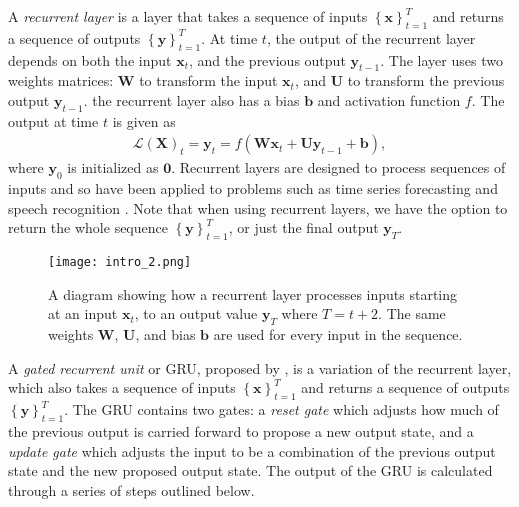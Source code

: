 \documentclass{somasmsc}
\begin{document}
A \textit{recurrent layer} is a layer that takes a sequence of inputs $\left\{\pmb{x}\right\}_{t=1}^T$ and returns a sequence of outputs $\left\{\pmb{y}\right\}_{t=1}^T$. At time $t$, the output of the recurrent layer depends on both the input $\pmb{x}_t$, and the previous output $\pmb{y}_{t-1}$. The layer uses two weights matrices: $\mathbf{W}$ to transform the input $\pmb{x}_t$, and $\mathbf{U}$ to transform the previous output $\pmb{y}_{t-1}$. the recurrent layer also has a bias $\pmb{b}$ and activation function $f$. The output at time $t$ is given as
\begin{align*}
\mathcal{L}\left(\mathbf{X}\right)_t = \pmb{y}_t = f(\mathbf{W}\pmb{x}_t + \mathbf{U}\pmb{y}_{t-1} + \pmb{b}),
\end{align*}
where $\pmb{y}_0$ is initialized as $\mathbf{0}$. Recurrent layers are designed to process sequences of inputs and so have been applied to problems such as time series forecasting and speech recognition \citep{graves2013speech}. Note that when using recurrent layers, we have the option to return the whole sequence $\left\{\pmb{y}\right\}_{t=1}^T$, or just the final output $\pmb{y}_T$.

\begin{figure}[H]
\begin{center}
\texttt{[image: intro\_2.png]}
\end{center}
\caption{A diagram showing how a recurrent layer processes inputs starting at an input $\pmb{x}_t$, to an output value $\pmb{y}_T$ where $T=t+2$. The same weights $\mathbf{W}$, $\mathbf{U}$, and bias $\pmb{b}$ are used for every input in the sequence.}
\end{figure}

A \textit{gated recurrent unit} or GRU, proposed by \citet{DBLP:journals/corr/ChoMGBSB14}, is a variation of the recurrent layer, which also takes a sequence of inputs $\left\{\pmb{x}\right\}_{t=1}^T$ and returns a sequence of outputs $\left\{\pmb{y}\right\}_{t=1}^T$. The GRU contains two gates: a \textit{reset gate} which adjusts how much of the previous output is carried forward to propose a new output state, and a \textit{update gate} which adjusts the input to be a combination of the previous output state and the new proposed output state. The output of the GRU is calculated through a series of steps outlined below.
\end{document}
